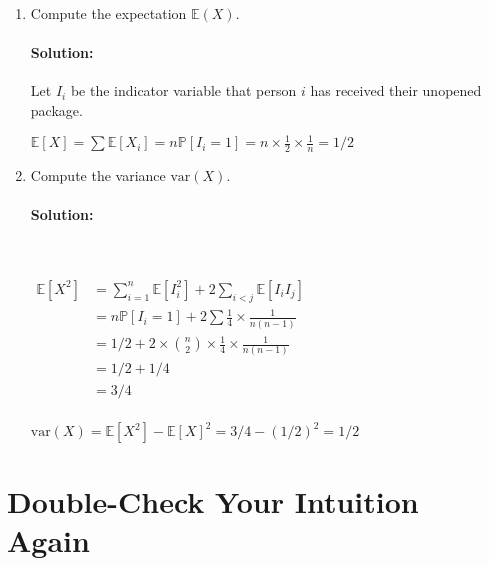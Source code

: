 \documentclass[11pt, notitlepage]{article}
\newcommand{\E}{\mathbb{E}}
\newcommand{\mP}{\mathbb{P}}
\newcommand{\var}{\text{var}}
\newcommand{\Question}[1]{\newpage\section{#1}}
\newenvironment{solution}{\paragraph{Solution:}}{\hfill \vspace{10mm}}
\begin{document}
\begin{enumerate}[label=\alph*.)]

\item Compute the expectation $\E(X)$.
	\begin{solution} Let $I_i$ be the indicator variable that person $i$ has received their unopened package.
	
	$\E[X]=\sum\E[X_i]=n\mP[I_i=1]=n\times {\frac{1}{2}\times\frac{1}{n}}=1/2$
	\end{solution}

\item Compute the variance $\var(X)$.
	\begin{solution}\
	
	$\begin{aligned}\E[X^2]&=\sum_{i=1}^{n}{\E[I_i^2]}+2\sum_{i<j}{\E[I_iI_j]} \\
	&=n\mP[I_i=1]+2\sum{\frac{1}{4}\times\frac{1}{n(n-1)}}\\
	&=1/2+2\times \binom{n}{2}\times {\frac{1}{4}\times\frac{1}{n(n-1)}}\\
	&=1/2+1/4\\
	&=3/4\\
	\end{aligned}$
	
	$\var(X)=\E[X^2]-\E[X]^2=3/4-(1/2)^2=1/2$
	\end{solution}

\end{enumerate}



\Question{Double-Check Your Intuition Again}
\end{document}
